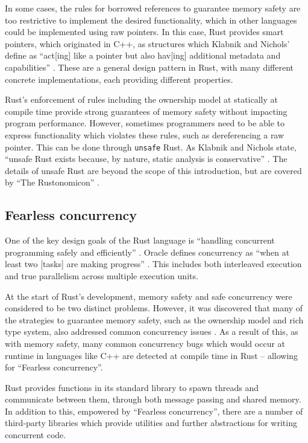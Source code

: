 In some cases, the rules for borrowed references to guarantee memory safety are too restrictive to implement the desired functionality, which in other languages could be implemented using raw pointers. In this case, Rust provides smart pointers, which originated in C++, as structures which Klabnik and Nichols' define as ``act[ing] like a pointer but also hav[ing] additional metadata and capabilities'' \cite{RustProgrammingLanguage}. These are a general design pattern in Rust, with many different concrete implementations, each providing different properties.

Rust's enforcement of rules including the ownership model at statically at compile time provide strong guarantees of memory safety without impacting program performance. However, sometimes programmers need to be able to express functionality which violates these rules, such as dereferencing a raw pointer. This can be done through \texttt{unsafe} Rust. As Klabnik and Nichols state, ``unsafe Rust exists because, by nature, static analysis is conservative'' \cite{RustProgrammingLanguage}. The details of unsafe Rust are beyond the scope of this introduction, but are covered by ``The Rustonomicon''  \cite{IntroductionRustonomicon}.

\subsection{Fearless concurrency}
\label{ssec:rust-fearless-concurrency}

One of the key design goals of the Rust language is ``handling concurrent programming safely and efficiently'' \cite{RustProgrammingLanguage}. Oracle defines concurrency as ``when at least two [tasks] are making progress'' \cite{DefiningMultithreadingTerms}. This includes both interleaved execution and true parallelism across multiple execution units.

At the start of Rust's development, memory safety and safe concurrency were considered to be two distinct problems. However, it was discovered that many of the strategies to guarantee memory safety, such as the ownership model and rich type system, also addressed common concurrency issues \cite{FearlessConcurrencyRust}. As a result of this, as with memory safety, many common concurrency bugs which would occur at runtime in languages like C++ are detected at compile time in Rust -- allowing for ``Fearless concurrency''.

Rust provides functions in its standard library to spawn threads and communicate between them, through both message passing and shared memory. In addition to this, empowered by ``Fearless concurrency'', there are a number of third-party libraries which provide utilities and further abstractions for writing concurrent code.

